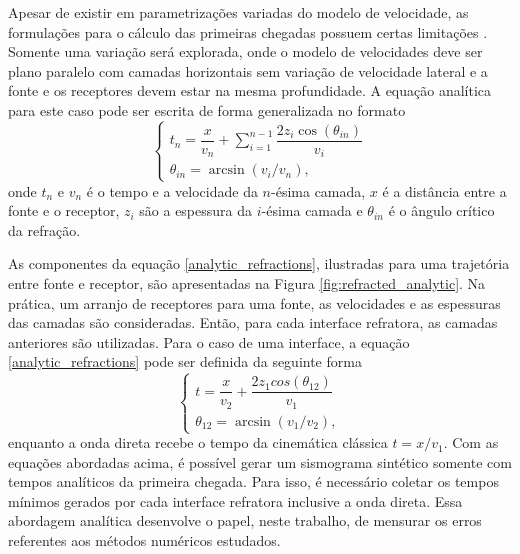 Apesar de existir em parametrizações variadas do modelo de velocidade, as formulações para o cálculo das primeiras chegadas possuem certas limitações \cite{kearey2002introduction}. Somente uma variação será explorada, onde o modelo de velocidades deve ser plano paralelo com camadas horizontais sem variação de velocidade lateral e a fonte e os receptores devem estar na mesma profundidade. A equação analítica para este caso pode ser escrita de forma generalizada no formato 
\begin{equation}
	\begin{cases}
		t_n = \dfrac{x}{v_n} + \displaystyle\sum_{i=1}^{n-1} \dfrac{2z_i \cos(\theta_{in})}{v_i}\\
		\theta_{in} = \arcsin(v_i / v_n),
	\end{cases}
	\label{analytic_refractions}
\end{equation}
\noindent onde $t_n$ e $v_n$ é o tempo e a velocidade da $n$-ésima camada, $x$ é a distância entre a fonte e o receptor, $z_i$ são a espessura da $i$-ésima camada e $\theta_{in}$ é o ângulo crítico da refração. 

As componentes da equação \ref{analytic_refractions}, ilustradas para uma trajetória entre fonte e receptor, são apresentadas na Figura \ref{fig:refracted_analytic}. Na prática, um arranjo de receptores para uma fonte, as velocidades e as espessuras das camadas são consideradas. Então, para cada interface refratora, as camadas anteriores são utilizadas. Para o caso de uma interface, a equação \ref{analytic_refractions} pode ser definida da seguinte forma 
\begin{equation}
	\begin{cases}
		t = \dfrac{x}{v_2} + \dfrac{2z_1cos(\theta_{12})}{v_1}\\
		\theta_{12} = \arcsin(v_1 / v_2),
	\end{cases}
	\label{analytic_one_layer_case}
\end{equation}    
\noindent enquanto a onda direta recebe o tempo da cinemática clássica $t = x / v_1$. Com as equações abordadas acima, é possível gerar um sismograma sintético somente com tempos analíticos da primeira chegada. Para isso, é necessário coletar os tempos mínimos gerados por cada interface refratora inclusive a onda direta. Essa abordagem analítica desenvolve o papel, neste trabalho, de mensurar os erros referentes aos métodos numéricos estudados.

